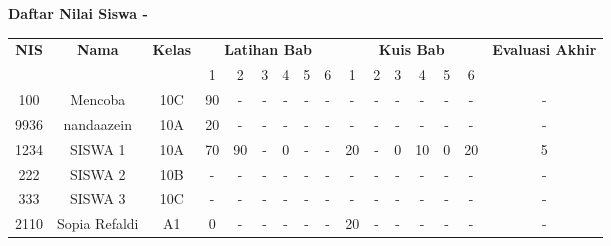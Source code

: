 \documentclass[a4paper,12pt]{article}
\begin{document}
\begin{landscape}
\begin{center}
{\Large \textbf{Daftar Nilai Siswa -}}
\end{center}

\vspace{0.5cm}

\begin{longtable}{|c|c|c|*{6}{c}|*{6}{c}|c|}
\hline
\rowcolor{gray}
\textbf{NIS} & \textbf{Nama} & \textbf{Kelas} & \multicolumn{6}{c|}{\textbf{Latihan Bab}} & \multicolumn{6}{c|}{\textbf{Kuis Bab}} & \textbf{Evaluasi Akhir} \\
\cline{4-15}
\rowcolor{gray}
& & & 1 & 2 & 3 & 4 & 5 & 6 & 1 & 2 & 3 & 4 & 5 & 6 & \\
\hline
\endhead
100 & Mencoba & 10C & 90 & - & - & - & - & - & - & - & - & - & - & - & - \\ \hline
9936 & nandaazein & 10A & 20 & - & - & - & - & - & - & - & - & - & - & - & - \\ \hline
1234 & SISWA 1 & 10A & 70 & 90 & - & 0 & - & - & 20 & - & 0 & 10 & 0 & 20 & 5 \\ \hline
222 & SISWA 2 & 10B & - & - & - & - & - & - & - & - & - & - & - & - & - \\ \hline
333 & SISWA 3 & 10C & - & - & - & - & - & - & - & - & - & - & - & - & - \\ \hline
2110 & Sopia Refaldi & A1 & 0 & - & - & - & - & - & 20 & - & - & - & - & - & - \\ \hline

\end{longtable}
\end{landscape}
\end{document}
